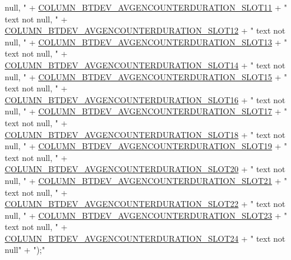 \begin{DoxyCode}
{       null, "}
            + \hyperlink{classcs_1_1nsense_1_1db_1_1_n_sense_s_q_lite_helper_ae18ebf70e1ed9a14210d2b1b24ec4726}{COLUMN\_BTDEV\_AVGENCOUNTERDURATION\_SLOT11} + \textcolor{stringliteral}{" text not
       null, "}
            + \hyperlink{classcs_1_1nsense_1_1db_1_1_n_sense_s_q_lite_helper_a8b66fb3e7675417d15034e51c6031bd1}{COLUMN\_BTDEV\_AVGENCOUNTERDURATION\_SLOT12} + \textcolor{stringliteral}{" text not
       null, "}
            + \hyperlink{classcs_1_1nsense_1_1db_1_1_n_sense_s_q_lite_helper_a032e9a2a6b81ee461d88cd3e20da323c}{COLUMN\_BTDEV\_AVGENCOUNTERDURATION\_SLOT13} + \textcolor{stringliteral}{" text not
       null, "}
            + \hyperlink{classcs_1_1nsense_1_1db_1_1_n_sense_s_q_lite_helper_abcc96b7e96f231319c945b5a1c0dfed4}{COLUMN\_BTDEV\_AVGENCOUNTERDURATION\_SLOT14} + \textcolor{stringliteral}{" text not
       null, "}
            + \hyperlink{classcs_1_1nsense_1_1db_1_1_n_sense_s_q_lite_helper_aa2b4166df8ffcaed76068483d9d21fba}{COLUMN\_BTDEV\_AVGENCOUNTERDURATION\_SLOT15} + \textcolor{stringliteral}{" text not
       null, "}
            + \hyperlink{classcs_1_1nsense_1_1db_1_1_n_sense_s_q_lite_helper_aefa4e03242dc91e4ce441bf0b0936178}{COLUMN\_BTDEV\_AVGENCOUNTERDURATION\_SLOT16} + \textcolor{stringliteral}{" text not
       null, "}
            + \hyperlink{classcs_1_1nsense_1_1db_1_1_n_sense_s_q_lite_helper_a183659b2ef2e1a2d36150b9e84e04879}{COLUMN\_BTDEV\_AVGENCOUNTERDURATION\_SLOT17} + \textcolor{stringliteral}{" text not
       null, "}
            + \hyperlink{classcs_1_1nsense_1_1db_1_1_n_sense_s_q_lite_helper_a0b5f29f21cf17f536bb4ae191e040417}{COLUMN\_BTDEV\_AVGENCOUNTERDURATION\_SLOT18} + \textcolor{stringliteral}{" text not
       null, "}
            + \hyperlink{classcs_1_1nsense_1_1db_1_1_n_sense_s_q_lite_helper_a0ae214906e5fdc66a00c2b5f2771ca65}{COLUMN\_BTDEV\_AVGENCOUNTERDURATION\_SLOT19} + \textcolor{stringliteral}{" text not
       null, "}
            + \hyperlink{classcs_1_1nsense_1_1db_1_1_n_sense_s_q_lite_helper_a553da8f0e3082738bd9fe051ab40e362}{COLUMN\_BTDEV\_AVGENCOUNTERDURATION\_SLOT20} + \textcolor{stringliteral}{" text not
       null, "}
            + \hyperlink{classcs_1_1nsense_1_1db_1_1_n_sense_s_q_lite_helper_a528a19b3974495bed3ac33c1d638ca5d}{COLUMN\_BTDEV\_AVGENCOUNTERDURATION\_SLOT21} + \textcolor{stringliteral}{" text not
       null, "}
            + \hyperlink{classcs_1_1nsense_1_1db_1_1_n_sense_s_q_lite_helper_afd369ed86e5e3f1e23acd11fabe385ab}{COLUMN\_BTDEV\_AVGENCOUNTERDURATION\_SLOT22} + \textcolor{stringliteral}{" text not
       null, "}
            + \hyperlink{classcs_1_1nsense_1_1db_1_1_n_sense_s_q_lite_helper_a0554b63beef7b9ee6c6f5e4e567a1048}{COLUMN\_BTDEV\_AVGENCOUNTERDURATION\_SLOT23} + \textcolor{stringliteral}{" text not
       null, "}
            + \hyperlink{classcs_1_1nsense_1_1db_1_1_n_sense_s_q_lite_helper_a1658e2b1ff310225d5a5ffc818a9809f}{COLUMN\_BTDEV\_AVGENCOUNTERDURATION\_SLOT24} + \textcolor{stringliteral}{" text not
       null"}
            + \textcolor{stringliteral}{");"}
\end{DoxyCode}
